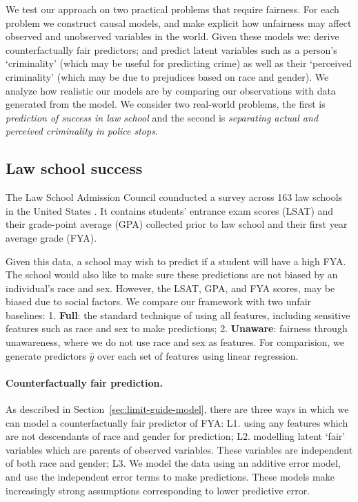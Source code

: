 We test our approach on two practical problems that require  fairness. For each problem we construct causal models, and make explicit how unfairness may affect observed and unobserved variables in the world. Given these models we: derive counterfactually fair predictors; and predict latent variables such as a person's `criminality' (which may be useful for predicting crime) as well as their `perceived criminality' (which may be due to prejudices based on race and gender). We analyze how realistic our models are by comparing our observations with data generated from the model. We consider two real-world problems, the first is \emph{prediction of success in law school} and the second is \emph{separating actual and perceived criminality in police stops}.

\subsection{Law school success}
\label{sec:law-school-success}
The Law School Admission Council
counducted a survey across 163 law
schools in the United States \cite{wightman1998lsac}. %
It contains students'  entrance exam scores (LSAT) and their grade-point
average (GPA) collected prior to law school and their first year average grade
(FYA). %

Given this data, a  school may wish to predict if a  student will
have a high FYA. %
The school would also like to make sure these
predictions are not biased by an individual's race and sex. However,
the LSAT, GPA, and FYA scores, may be biased due to social factors. %
We compare our framework with
two unfair baselines: 1. \textbf{Full}: the standard technique of
using all features, including sensitive features such as race and sex
to make predictions; 2. \textbf{Unaware}: fairness through
unawareness, where we do not use race and sex as features. For comparision, we generate predictors $\hat y$
over each set of features using linear regression.

\paragraph{Counterfactually fair prediction.}
As described in Section~\ref{sec:limit-guide-model},  there are three ways in which we can model a counterfactually fair predictor of FYA: L1. using any features which are not descendants of race and gender for prediction; L2. modelling latent `fair' variables which are parents of observed variables. These variables are independent of both race and gender; L3. We model the data using an additive error model, and use the independent error terms to make predictions. These models make increasingly strong assumptions corresponding to lower predictive error.


